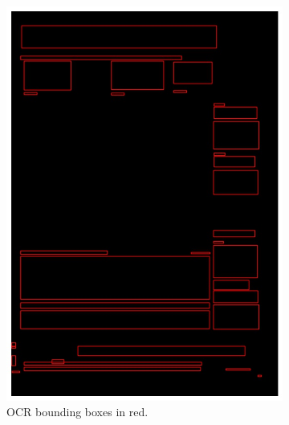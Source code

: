 \documentclass[oneside, english, bibtex]{kththesis}
\begin{document}
\begin{figure}[!htb]
\begin{adjustbox}{center,max size={\textwidth}{0.9\textheight}}
\parbox{1.5\textwidth}{\lineskip=0pt
\begin{subfigure}{0.75\textwidth}
  \centering
  \includegraphics[width=\linewidth, clip=true, trim = 0mm 0mm 0mm 0mm]{figures/ocr/JIefsDa.jpg}
  \caption{OCR bounding boxes in red.}
  \label{fig:JIefsDa_OCR_tf}
\end{subfigure}%
\begin{subfigure}{0.75\textwidth}
  \centering

\end{subfigure}}
\end{adjustbox}
\end{figure}
\end{document}
